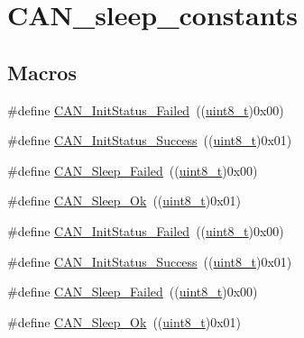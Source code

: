 \hypertarget{group___c_a_n__sleep__constants}{}\section{C\+A\+N\+\_\+sleep\+\_\+constants}
\label{group___c_a_n__sleep__constants}
\subsection*{Macros}
\begin{DoxyCompactItemize}
\item 
\#define \hyperlink{group___c_a_n__sleep__constants_ga095c319e8c54c974eb2b6eeadf180d96}{C\+A\+N\+\_\+\+Init\+Status\+\_\+\+Failed}~((\hyperlink{_p_e___types_8h_aba7bc1797add20fe3efdf37ced1182c5}{uint8\+\_\+t})0x00)
\item 
\#define \hyperlink{group___c_a_n__sleep__constants_ga6bed5957af8f2f6b00568e15ccac5772}{C\+A\+N\+\_\+\+Init\+Status\+\_\+\+Success}~((\hyperlink{_p_e___types_8h_aba7bc1797add20fe3efdf37ced1182c5}{uint8\+\_\+t})0x01)
\item 
\#define \hyperlink{group___c_a_n__sleep__constants_ga169500ab7169c4e9c7e9e4ea34b3e070}{C\+A\+N\+\_\+\+Sleep\+\_\+\+Failed}~((\hyperlink{_p_e___types_8h_aba7bc1797add20fe3efdf37ced1182c5}{uint8\+\_\+t})0x00)
\item 
\#define \hyperlink{group___c_a_n__sleep__constants_gaf5c4e9d32d4faff9d0bf61e153ed7998}{C\+A\+N\+\_\+\+Sleep\+\_\+\+Ok}~((\hyperlink{_p_e___types_8h_aba7bc1797add20fe3efdf37ced1182c5}{uint8\+\_\+t})0x01)
\item 
\#define \hyperlink{group___c_a_n__sleep__constants_ga095c319e8c54c974eb2b6eeadf180d96}{C\+A\+N\+\_\+\+Init\+Status\+\_\+\+Failed}~((\hyperlink{_p_e___types_8h_aba7bc1797add20fe3efdf37ced1182c5}{uint8\+\_\+t})0x00)
\item 
\#define \hyperlink{group___c_a_n__sleep__constants_ga6bed5957af8f2f6b00568e15ccac5772}{C\+A\+N\+\_\+\+Init\+Status\+\_\+\+Success}~((\hyperlink{_p_e___types_8h_aba7bc1797add20fe3efdf37ced1182c5}{uint8\+\_\+t})0x01)
\item 
\#define \hyperlink{group___c_a_n__sleep__constants_ga169500ab7169c4e9c7e9e4ea34b3e070}{C\+A\+N\+\_\+\+Sleep\+\_\+\+Failed}~((\hyperlink{_p_e___types_8h_aba7bc1797add20fe3efdf37ced1182c5}{uint8\+\_\+t})0x00)
\item 
\#define \hyperlink{group___c_a_n__sleep__constants_gaf5c4e9d32d4faff9d0bf61e153ed7998}{C\+A\+N\+\_\+\+Sleep\+\_\+\+Ok}~((\hyperlink{_p_e___types_8h_aba7bc1797add20fe3efdf37ced1182c5}{uint8\+\_\+t})0x01)
\end{DoxyCompactItemize}



